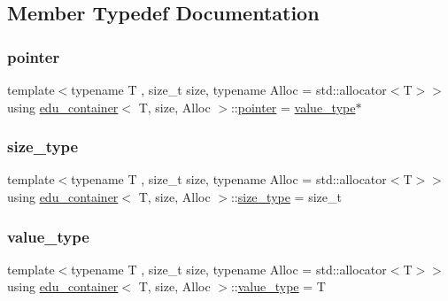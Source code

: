 \subsection{Member Typedef Documentation}
\mbox{\label{classedu__container_a20f66877e7a564cb76a3f7d5a5f6ff59}} 
\subsubsection{\texorpdfstring{pointer}{pointer}}
{\footnotesize\ttfamily template$<$typename T , size\+\_\+t size, typename Alloc  = std\+::allocator$<$\+T$>$$>$ \\
using \hyperlink{classedu__container}{edu\+\_\+container}$<$ T, size, Alloc $>$\+::\hyperlink{classedu__container_a20f66877e7a564cb76a3f7d5a5f6ff59}{pointer} =  \hyperlink{classedu__container_a1a1a693013d3f6fd261d6e3532ec2a11}{value\+\_\+type}$\ast$}

\mbox{\label{classedu__container_a2a83d6329e026dd119b001b0e0d9c9f5}} 
\subsubsection{\texorpdfstring{size\+\_\+type}{size\_type}}
{\footnotesize\ttfamily template$<$typename T , size\+\_\+t size, typename Alloc  = std\+::allocator$<$\+T$>$$>$ \\
using \hyperlink{classedu__container}{edu\+\_\+container}$<$ T, size, Alloc $>$\+::\hyperlink{classedu__container_a2a83d6329e026dd119b001b0e0d9c9f5}{size\+\_\+type} =  size\+\_\+t}

\mbox{\label{classedu__container_a1a1a693013d3f6fd261d6e3532ec2a11}} 
\subsubsection{\texorpdfstring{value\+\_\+type}{value\_type}}
{\footnotesize\ttfamily template$<$typename T , size\+\_\+t size, typename Alloc  = std\+::allocator$<$\+T$>$$>$ \\
using \hyperlink{classedu__container}{edu\+\_\+container}$<$ T, size, Alloc $>$\+::\hyperlink{classedu__container_a1a1a693013d3f6fd261d6e3532ec2a11}{value\+\_\+type} =  T}



